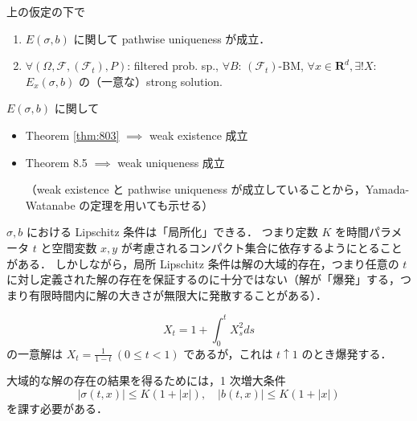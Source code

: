 \documentclass{jsarticle}
\begin{document}
\setcounter{thm}{2}

\begin{screen}
    \begin{thm}\label{thm:803}
        上の仮定の下で
        \begin{enumerate}[label=(\roman*)]
            \item
            $E(\sigma, b)$ に関して pathwise uniqueness が成立．
            \item
            $\forall (\Omega, \mathcal{F}, (\mathcal{F}_t), P)$: filtered prob. sp., $\forall B$: $(\mathcal{F}_t)$-BM, $\forall x\in\mathbf{R}^d, \exists! X$: $E_x(\sigma, b)$ の（一意な）strong solution.
        \end{enumerate}
    \end{thm}
\end{screen}

$E(\sigma, b)$ に関して 
\begin{itemize}
    \item 
    Theorem \ref{thm:803}
    $\implies $ weak existence 成立
    \item
    Theorem 8.5
    $\implies $ weak uniqueness 成立
    
    （weak existence と pathwise uniqueness が成立していることから，Yamada-Watanabe の定理を用いても示せる）
\end{itemize}

\begin{remark*}
    $\sigma, b$ における Lipschitz 条件は「局所化」できる．
    つまり定数 $K$ を時間パラメータ $t$ と空間変数 $x, y$ が考慮されるコンパクト集合に依存するようにとることがある．
    しかしながら，局所 Lipschitz 条件は解の大域的存在，つまり任意の $t$ に対し定義された解の存在を保証するのに十分ではない（解が「爆発」する，つまり有限時間内に解の大きさが無限大に発散することがある）．

    \begin{ex*}
        $$
        X_t
        = 1+\int_0^t X_s^2 ds
        $$
        の一意解は $X_t=\frac{1}{1-t}\ (0\le t<1)$ であるが，これは $t\uparrow1$ のとき爆発する．
    \end{ex*}
    
    大域的な解の存在の結果を得るためには，1 次増大条件
    $$
    \left\lvert \sigma(t, x)\right\rvert\le K(1+\left\lvert x\right\rvert), \quad
    \left\lvert b(t, x)\right\rvert\le K(1+\left\lvert x\right\rvert)
    $$
    を課す必要がある．
\end{remark*}
\end{document}
